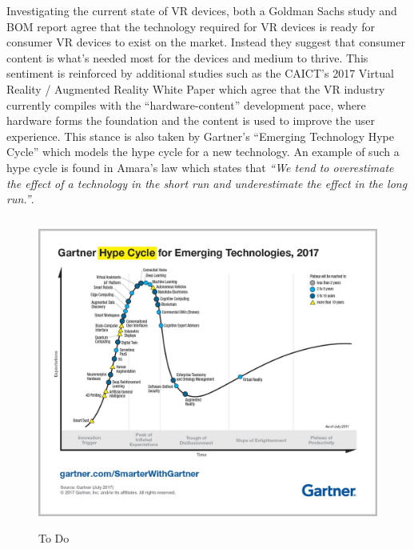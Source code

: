 \documentclass{l4proj}
\begin{document}
Investigating the current state of VR devices, both a Goldman Sachs study \cite{Goldman} and BOM report \cite{BOM} agree that the technology required for VR devices is ready for consumer VR devices to exist on the market. Instead they suggest that consumer content is what's needed most for the devices and medium to thrive. This sentiment is reinforced by additional studies such as the CAICT's 2017 Virtual Reality / Augmented Reality White Paper \cite{WhitePaper}  which agree that the VR industry currently compiles with the ``hardware-content'' development pace, where hardware forms the foundation and the content is used to improve the user experience. This stance is also taken by Gartner's ``Emerging Technology Hype Cycle'' which models the hype cycle for a new technology. An example of such a hype cycle is found in Amara's law which states that \textit{``We tend to overestimate the effect of a technology in the short run and underestimate the effect in the long run.''}.

\begin{figure}[h]
\centering
\includegraphics[height=10.2cm,width=14.2cm]{dissertation/gartner_hype_cycle.jpg}
\caption{To Do}
\label{gartner_hype_cycle}
\end{figure}
\end{document}
